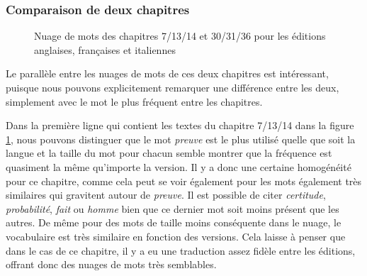 \subsubsection{Comparaison de deux chapitres}
\begin{figure}[t]
    \centering
    \caption{Nuage de mots des chapitres 7/13/14 et 30/31/36 pour les éditions anglaises, françaises et italiennes}
    \label{fig:word_cloud}
\end{figure}
Le parallèle entre les nuages de mots de ces deux chapitres est intéressant, puisque nous pouvons explicitement remarquer une différence entre les deux, simplement avec le mot le plus fréquent entre les chapitres. 

Dans la première ligne qui contient les textes du chapitre 7/13/14 dans la figure \ref{fig:word_cloud}, nous pouvons distinguer que le mot \textit{preuve} est le plus utilisé quelle que soit la langue et la taille du mot pour chacun semble montrer que la fréquence est quasiment la même qu'importe la version. Il y a donc une certaine homogénéité pour ce chapitre, comme cela peut se voir également pour les mots également très similaires qui gravitent autour de \textit{preuve}. Il est possible de citer \textit{certitude}, \textit{probabilité}, \textit{fait} ou \textit{homme} bien que ce dernier mot soit moins présent que les autres. De même pour des mots de taille moins conséquente dans le nuage, le vocabulaire est très similaire en fonction des versions. Cela laisse à penser que dans le cas de ce chapitre, il y a eu une traduction assez fidèle entre les éditions, offrant donc des nuages de mots très semblables.

